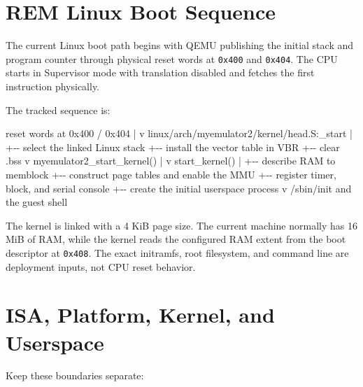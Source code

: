 \documentclass[
  oneside,
  openany]{book}
\newenvironment{Shaded}{\begin{snugshade}}{\end{snugshade}}
\newcommand{\NormalTok}[1]{#1}
\begin{document}
\hypertarget{rem-linux-boot-sequence}{%
\chapter{REM Linux Boot Sequence}\label{rem-linux-boot-sequence}}

The current Linux boot path begins with QEMU publishing the initial
stack and program counter through physical reset words at \texttt{0x400}
and \texttt{0x404}. The CPU starts in Supervisor mode with translation
disabled and fetches the first instruction physically.

The tracked sequence is:

\begin{Shaded}
\begin{Highlighting}[]
\NormalTok{reset words at 0x400 / 0x404}
\NormalTok{        |}
\NormalTok{        v}
\NormalTok{linux/arch/myemulator2/kernel/head.S:\_start}
\NormalTok{        |}
\NormalTok{        +{-}{-} select the linked Linux stack}
\NormalTok{        +{-}{-} install the vector table in VBR}
\NormalTok{        +{-}{-} clear .bss}
\NormalTok{        v}
\NormalTok{myemulator2\_start\_kernel()}
\NormalTok{        |}
\NormalTok{        v}
\NormalTok{start\_kernel()}
\NormalTok{        |}
\NormalTok{        +{-}{-} describe RAM to memblock}
\NormalTok{        +{-}{-} construct page tables and enable the MMU}
\NormalTok{        +{-}{-} register timer, block, and serial console}
\NormalTok{        +{-}{-} create the initial userspace process}
\NormalTok{        v}
\NormalTok{/sbin/init and the guest shell}
\end{Highlighting}
\end{Shaded}

The kernel is linked with a 4 KiB page size. The current machine
normally has 16 MiB of RAM, while the kernel reads the configured RAM
extent from the boot descriptor at \texttt{0x408}. The exact initramfs,
root filesystem, and command line are deployment inputs, not CPU reset
behavior.

\hypertarget{isa-platform-kernel-and-userspace}{%
\chapter{ISA, Platform, Kernel, and
Userspace}\label{isa-platform-kernel-and-userspace}}

Keep these boundaries separate:
\end{document}
